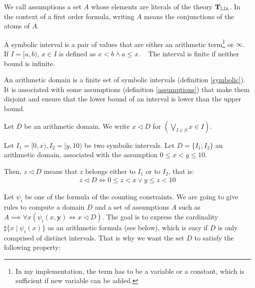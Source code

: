 \begin{definition}[Assumptions]

We call assumptions a set $A$ whose elements are literals of the theory
$\operatorname{\mathbf{T}_{\mathbb{LIA}}}$. In the context of a first order formula, writing $A$
means the conjunctions of the atoms of $A$.

\label{assumptions}

\end{definition}


\begin{definition}

A symbolic interval is a pair of values that are either an arithmetic
term\footnote{In my implementation, the term has to be a variable or a constant,
which is sufficient if new variable can be added.} or $\infty$. If $I = [a, b)$, $x \in I$ is
defined as $x < b \land a \le x$. \newline~\newline
The interval is finite if neither bound is infinite.

\label{symbolic}

\end{definition}


\begin{definition}

An arithmetic domain is a finite set of symbolic intervals (definition
\ref{symbolic}). It is  associated with some assumptions
(definition \ref{assumptions}) that make them disjoint and ensure that
the lower bound of an interval is lower than the upper bound.

\label{arithmetic}

\end{definition}

Let $D$ be an arithmetic domain. We write $x \lhd D$ for
$\left(\bigvee\limits_{I \in S} x \in I\right)$.

\begin{example}
Let $I_1 = [0, x), I_2 = [y, 10)$ be two symbolic intervals. Let $D = \{I_1,
I_2\}$
an arithmetic domain, associated with the assumption $0 \leq x < y \leq 10$.

Then, $z \lhd D$ means that $z$ belongs either to $I_1$ or to $I_2$, that is:
\begin{align*} z \lhd D \iff 0 \leq z < x \lor y \leq z < 10\end{align*}
\end{example}

Let $\psi_i$ be one of the formula of the counting constraints. We are going to
give rules to compute a domain $D$ and a set of assumptions $A$ such as
$A \implies \forall x \left(\psi_i(x, \mathbf{y}) \iff x \lhd D\right)$. The goal is to express the
cardinality $\sharp\{x \mid \psi_i(x)\}$ as an arithmetic formula (see below), which is easy if $D$ is only
comprised of distinct intervals. That is why we want the set $D$
to satisfy the following property:


